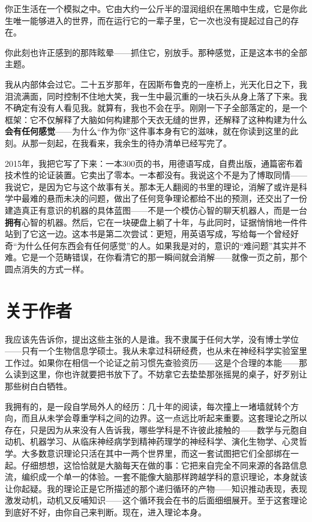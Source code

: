 \documentclass[11pt, twoside, openright]{book}
\begin{document}
你正生活在一个模拟之中。它由大约一公斤半的湿润组织在黑暗中生成，它是你此生唯一能够进入的世界，而在运行它的一辈子里，它一次也没有提起过自己的存在。

你此刻也许正感到的那阵眩晕------抓住它，别放手。那种感觉，正是这本书的全部主题。

我从内部体会过它。二十五岁那年，在因斯布鲁克的一座桥上，光天化日之下，我泪流满面，同时控制不住地大笑，我一生中最沉重的一块石头从身上落了下来。我不确定有没有人看见我。就算有，我也不会在乎。刚刚一下子全部落定的，是一个框架：它不仅解释了大脑如何构建那个天衣无缝的世界，还解释了这种构建为什么\textbf{会有任何感觉}------为什么“作为你”这件事本身有它的滋味，就在你读到这里的此刻。从那一刻起，在我看来，我余生的待办清单已经写完了。

2015年，我把它写了下来：一本300页的书，用德语写成，自费出版，通篇密布着技术性的论证装置。它卖出了零本。一本都没有。我说这个不是为了博取同情------我说它，是因为它与这个故事有关。那本无人翻阅的书里的理论，消解了或许是科学中最难的悬而未决的问题，做出了任何竞争理论都给不出的预测，还交出了一份建造真正有意识的机器的具体蓝图------不是一个模仿心智的聊天机器人，而是一台\textbf{拥有}心智的机器。然后，它在一块硬盘上躺了十年，与此同时，证据悄悄地一件件站到了它这一边。这本书是第二次尝试：更短，用英语写成，写给每一个曾经好奇“为什么任何东西会有任何感觉”的人。如果我是对的，意识的“难问题”其实并不难。它是一个范畴错误，在你看清它的那一瞬间就会消解------就像一页之前，那个圆点消失的方式一样。


\chapter*{关于作者}

我应该先告诉你，提出这些主张的人是谁。我不隶属于任何大学，没有博士学位------只有一个生物信息学硕士。我从未拿过科研经费，也从未在神经科学实验室里工作过。如果你在相信一个论证之前习惯先查验资历------这是个合理的本能------那么读到这里，你也许就要把书放下了。不妨拿它去垫垫那张摇晃的桌子，好歹别让那些树白白牺牲。

我拥有的，是一段自学局外人的经历：几十年的阅读，每次撞上一堵墙就转个方向，而且从未学会尊重学科之间的边界。这一点远比听起来重要。这套理论之所以存在，只是因为从来没有人告诉我，哪些学科是不许彼此接触的------数学与元胞自动机、机器学习、从临床神经病学到精神药理学的神经科学、演化生物学、心灵哲学。大多数意识理论只活在其中一两个世界里，而这一套试图把它们全部绑在一起。仔细想想，这恰恰就是大脑每天在做的事：它把来自完全不同来源的各路信息流，编织成一个单一的体验。一套不能像大脑那样跨越学科的意识理论，本身就该让你起疑。我的理论正是它所描述的那个递归循环的产物------知识推动表现，表现激发动机，动机又反哺知识------这个循环我会在书的后面细细展开。至于这套理论到底好不好，由你自己来判断。现在，进入理论本身。
\end{document}
